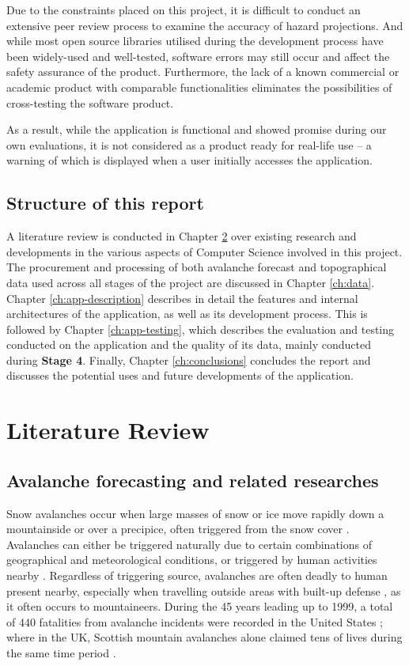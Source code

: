 \documentclass[openany]{UoYCSproject}
\begin{document}
Due to the constraints placed on this project, it is difficult to conduct an extensive peer review process to examine the accuracy of hazard projections. And while most open source libraries utilised during the development process have been widely-used and well-tested, software errors may still occur and affect the safety assurance of the product. Furthermore, the lack of a known commercial or academic product with comparable functionalities eliminates the possibilities of cross-testing the software product.

As a result, while the application is functional and showed promise during our own evaluations, it is not considered as a product ready for real-life use -- a warning of which is displayed when a user initially accesses the application.

\section{Structure of this report}

A literature review is conducted in Chapter \ref{ch:lit-review} over existing research and developments in the various aspects of Computer Science involved in this project. The procurement and processing of both avalanche forecast and topographical data used across all stages of the project are discussed in Chapter \ref{ch:data}. Chapter \ref{ch:app-description} describes in detail the features and internal architectures of the application, as well as its development process. This is followed by Chapter \ref{ch:app-testing}, which describes the evaluation and testing conducted on the application and the quality of its data, mainly conducted during \textbf{Stage 4}. Finally, Chapter \ref{ch:conclusions} concludes the report and discusses the potential uses and future developments of the application.

\chapter{Literature Review} \label{ch:lit-review}

\section{Avalanche forecasting and related researches}

Snow avalanches occur when large masses of snow or ice move rapidly down a mountainside or over a precipice, often triggered from the snow cover \cite[p. 1]{91097820150101}. Avalanches can either be triggered naturally due to certain combinations of geographical \cite[p. 17]{91097820150101} and meteorological \cite[p. 23]{91097820150101} conditions, or triggered by human activities nearby \cite{schweizer2001characteristics}. Regardless of triggering source, avalanches are often deadly to human present nearby, especially when travelling outside areas with built-up defense \cite{91097820150101}, as it often occurs to mountaineers. During the 45 years leading up to 1999, a total of 440 fatalities from avalanche incidents were recorded in the United States \cite{PAGE1999146}; where in the UK, Scottish mountain avalanches alone claimed tens of lives during the same time period \cite{scottish-avalanches}.
\end{document}
